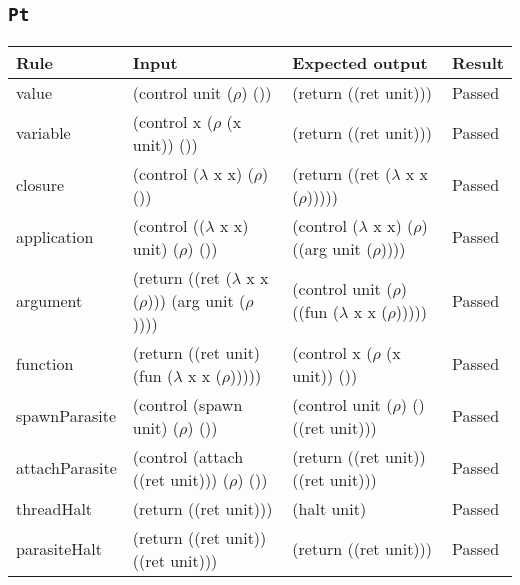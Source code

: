 \documentclass[12pt,a4paper,twoside,openright]{report}
\begin{document}
\subsection{\texttt{Pt}}
\begin{tabular}{| p{2.5cm} | p{5.5cm} |  p{5.5cm} | p{1.5cm} |}
\hline
\textbf{Rule} & \textbf{Input} & \textbf{Expected output} & \textbf{Result} \\ \hline
value & (control unit ($\rho$) ()) & (return ((ret unit))) & Passed \\ \hline
variable & (control x ($\rho$ (x unit)) ()) & (return ((ret unit))) & Passed \\ \hline
closure & (control ($\lambda$ x x) ($\rho$) ()) & (return ((ret ($\lambda$ x x ($\rho$))))) & Passed \\ \hline
application & (control (($\lambda$ x x) unit) ($\rho$) ()) & (control ($\lambda$ x x) ($\rho$) ((arg unit ($\rho$)))) & Passed \\ \hline
argument & (return ((ret ($\lambda$ x x ($\rho$))) (arg unit ($\rho$)))) & (control unit ($\rho$) ((fun ($\lambda$ x x ($\rho$))))) & Passed \\ \hline
function & (return ((ret unit) (fun ($\lambda$ x x ($\rho$))))) & (control x ($\rho$ (x unit)) ()) & Passed \\ \hline
spawnParasite & (control (spawn unit) ($\rho$) ()) & (control unit ($\rho$) () ((ret unit))) & Passed \\ \hline
attachParasite & (control (attach ((ret unit))) ($\rho$) ()) & (return ((ret unit)) ((ret unit))) & Passed \\ \hline
threadHalt & (return ((ret unit))) & (halt unit) & Passed \\ \hline
parasiteHalt & (return ((ret unit)) ((ret unit))) & (return ((ret unit))) & Passed \\ \hline
\end{tabular}
\end{document}
